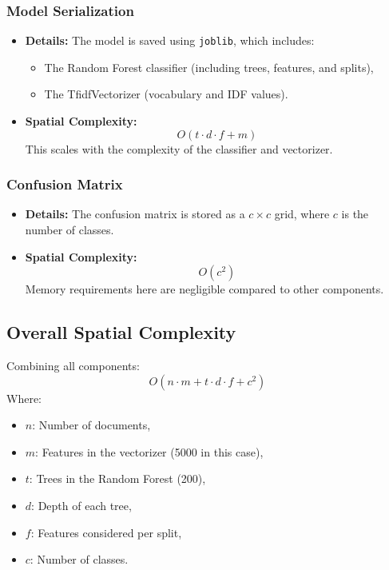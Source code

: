 \documentclass[runningheads,a4paper,11pt]{report}
\begin{document}
\subsubsection{Model Serialization}
\label{section:model}
\begin{itemize}
  \item \textbf{Details:} The model is saved using \texttt{joblib}, which includes:
  \begin{itemize}
    \item The Random Forest classifier (including trees, features, and splits),
    \item The TfidfVectorizer (vocabulary and IDF values).
  \end{itemize}
  \item \textbf{Spatial Complexity:}
  \[
  O(t \cdot d \cdot f + m)
  \]
  This scales with the complexity of the classifier and vectorizer.
\end{itemize}

\subsubsection{Confusion Matrix}
\label{section:confusion}
\begin{itemize}
  \item \textbf{Details:} The confusion matrix is stored as a $c \times c$ grid, where $c$ is the number of classes.
  \item \textbf{Spatial Complexity:}
  \[
  O(c^2)
  \]
  Memory requirements here are negligible compared to other components.
\end{itemize}

\subsection{Overall Spatial Complexity}
\label{section:overall-spatial}
Combining all components:
\[
O(n \cdot m + t \cdot d \cdot f + c^2)
\]
Where:
\begin{itemize}
  \item $n$: Number of documents,
  \item $m$: Features in the vectorizer (5000 in this case),
  \item $t$: Trees in the Random Forest (200),
  \item $d$: Depth of each tree,
  \item $f$: Features considered per split,
  \item $c$: Number of classes.
\end{itemize}
\end{document}
